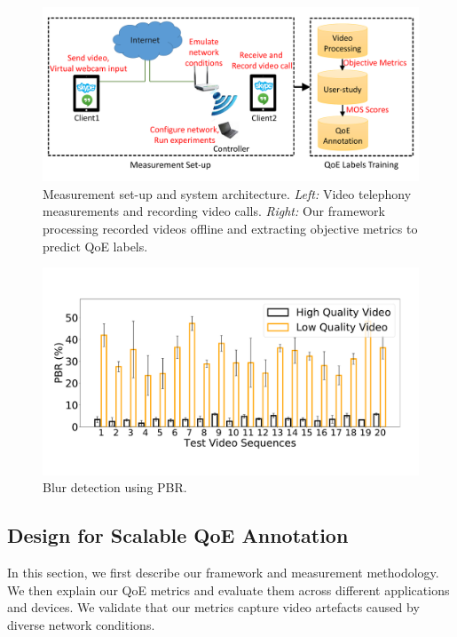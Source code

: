 \begin{figure}[t]
  \centering
  \includegraphics[width=\linewidth]{sections/network-work/setup}
     \vspace{-0.3in}
    \caption{Measurement set-up and system architecture. \textit{Left:} Video telephony measurements and recording video calls. \textit{Right:} Our framework processing recorded videos offline and extracting objective metrics to predict QoE labels.}
   \vspace{-0.2in}
  \label{fig:set-up}
\end{figure}
\begin{figure}[t]
  \centering
  \includegraphics[width=\linewidth]{sections/network-work/bar-pbr}
   \vspace{-0.5in}
  \caption{Blur detection using PBR.}
\vspace{-2em}
  \label{fig:ourblurdetection}
\end{figure}

\subsection{Design for Scalable QoE Annotation} \label{label:design}
In this section, we first describe our framework and measurement methodology. 
We then explain our QoE metrics and evaluate them across different applications and devices. We validate that our metrics capture video artefacts caused by diverse network conditions.
